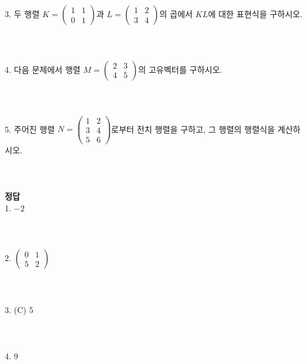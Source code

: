 \documentclass[fleqn]{article}
\begin{document}
3. 두 행렬 \( K = \begin{pmatrix} 1 & 1 \\ 0 & 1 \end{pmatrix} \)과 \( L = \begin{pmatrix} 1 & 2 \\ 3 & 4 \end{pmatrix} \)의 곱에서 \( KL \)에 대한 표현식을 구하시오. \\ 
\\\\\\

4. 다음 문제에서 행렬 \( M = \begin{pmatrix} 2 & 3 \\ 4 & 5 \end{pmatrix} \)의 고유벡터를 구하시오. \\ 
\\\\\\

5. 주어진 행렬 \( N = \begin{pmatrix} 1 & 2 \\ 3 & 4 \\ 5 & 6 \end{pmatrix} \)로부터 전치 행렬을 구하고, 그 행렬의 행렬식을 계산하시오. \\ 
\\\\\\

\noindent \textbf{정답} \\

1. \( -2 \) \\ 
\\\\\\

2. \( \begin{pmatrix} 0 & 1 \\ 5 & 2 \end{pmatrix} \) \\ 
\\\\\\

3. (C) 5 \\ 
\\\\\\

4. \( 9 \) \\ 
\\\\\\
\end{document}
